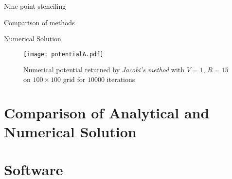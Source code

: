 \documentclass{beamer}
\begin{document}
\begin{frame}{Nine-point stenciling}
\end{frame}

\begin{frame}{Comparison of methods}
\end{frame}

\begin{frame}{Numerical Solution}

\begin{figure}
\begin{center}
\texttt{[image: potentialA.pdf]}
\caption{Numerical potential returned by \emph{Jacobi's method} with $V=1$, $R=15$ on
$100\times100$ grid for $10000$ iterations}
\label{fig:numerical}
\end{center}
\end{figure}

\end{frame}

\section{Comparison of Analytical and Numerical Solution}

\section{Software}
\end{document}
